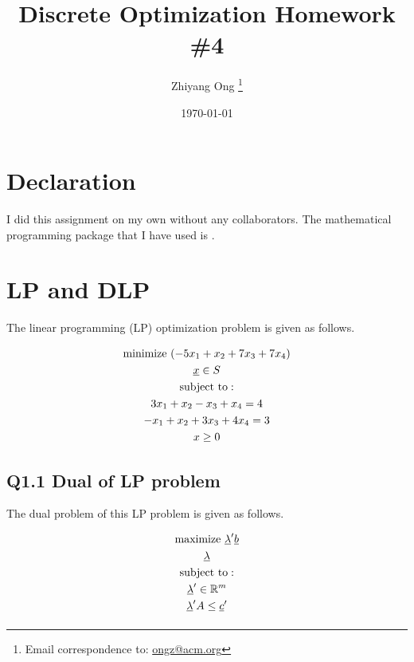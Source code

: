 \documentclass[letter,12pt]{article}
\begin{document}
\title{Discrete Optimization Homework \#4}
\date{\today}
\author{Zhiyang Ong
	\thanks{Email correspondence to: \href{mailto:ongz@acm.org}{ongz@acm.org}}
}
\maketitle






\section*{Declaration}
\label{sec:declaration}

I did this assignment on my own without any collaborators. The mathematical programming package that I have used is \cite{Makhorin2012}. 







\section{LP and DLP}
\label{sec:lpanddlp}

The linear programming (LP) optimization problem is given as follows.


\begin{eqnarray*}
	\begin{gathered}[b]
	{\rm minimize}\ (-5x_{1} + x_{2} + 7x_{3} + 7x_{4}) \\
	\underline{x} \in S \\
	{\rm subject\ to:} \\
	3x_{1} + x_{2} - x_{3} + x_{4} = 4 \\
	-x_{1} + x_{2} + 3x_{3} + 4x_{4} = 3 \\
	x \geq 0
	\end{gathered}
\end{eqnarray*}

\subsection{Q1.1 Dual of LP problem}
\label{sec:q1d1duallpprob}

The dual problem of this LP problem is given as follows.


\begin{eqnarray*}
	\begin{gathered}[b]
	{\rm maximize}\ \underline{\lambda}^{\prime} \underline{b} \\
	\underline{\lambda} \\
	{\rm subject\ to:} \\
	\underline{\lambda}^{\prime} \in \mathbb{R}^{m} \\
	\underline{\lambda}^{\prime} A \leq \underline{c}^{\prime} \\
	\end{gathered}
\end{eqnarray*}
\end{document}
